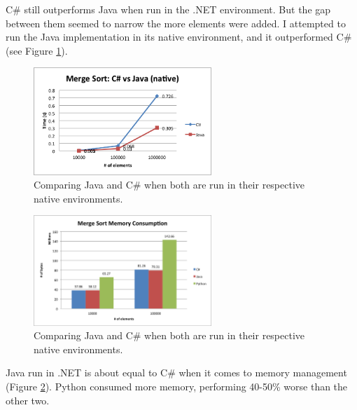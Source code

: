C\# still outperforms Java when run in the .NET environment. But the gap between them seemed to narrow the more elements were added. I attempted to run the Java implementation in its native environment, and it  outperformed C\# (see Figure \ref{fig:merge_sort_csharp_java_native}). 

\begin{figure}[h]
	\centering
	\includegraphics[width=0.6\textwidth]{chapters/media/merge_sort_csharp_java_native.png}
	\caption{Comparing Java and C\# when both are run in their respective native environments.}
	\label{fig:merge_sort_csharp_java_native}
\end{figure}

\begin{figure}[h]
	\centering
	\includegraphics[width=0.6\textwidth]{chapters/media/merge_sort_memory.png}
	\caption{Comparing Java and C\# when both are run in their respective native environments.}
	\label{fig:merge_sort_memory}
\end{figure}

Java run in .NET is about equal to C\# when it comes to memory management (Figure \ref{fig:merge_sort_memory}). Python consumed more memory, performing 40-50\% worse than the other two.


